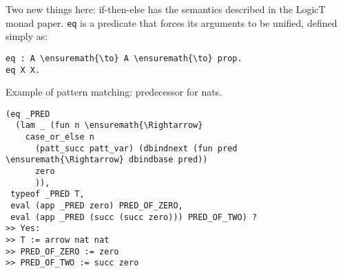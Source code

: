 Two new things here: if-then-else has the semantics described in the
LogicT monad paper. \texttt{eq} is a predicate that forces its arguments
to be unified, defined simply as:

\begin{verbatim}
eq : A \ensuremath{\to} A \ensuremath{\to} prop.
eq X X.
\end{verbatim}

Example of pattern matching: predecessor for nats.

\begin{verbatim}
(eq _PRED 
  (lam _ (fun n \ensuremath{\Rightarrow} 
    case_or_else n
      (patt_succ patt_var) (dbindnext (fun pred \ensuremath{\Rightarrow} dbindbase pred))
      zero
      )),
 typeof _PRED T,
 eval (app _PRED zero) PRED_OF_ZERO,
 eval (app _PRED (succ (succ zero))) PRED_OF_TWO) ?
>> Yes:
>> T := arrow nat nat
>> PRED_OF_ZERO := zero
>> PRED_OF_TWO := succ zero
\end{verbatim}
